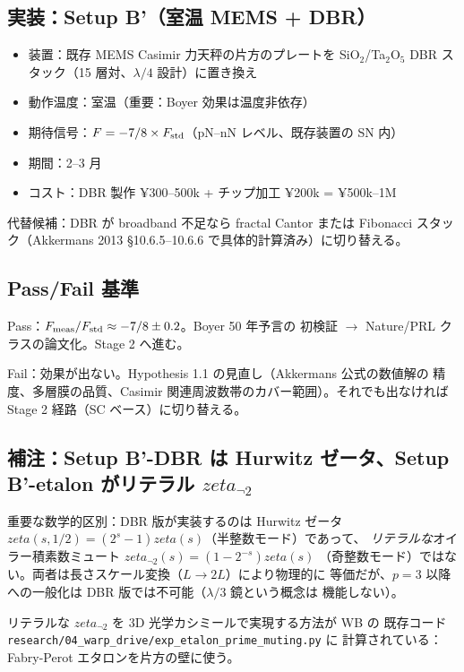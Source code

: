 \documentclass[11pt,a4paper]{article}
\def\zeta{zeta}%
\def\textbf#1{#1}%
\begin{document}
\subsection{実装：Setup B'（室温 MEMS + DBR）}

\begin{itemize}
\item 装置：既存 MEMS Casimir 力天秤の片方のプレートを SiO$_2$/Ta$_2$O$_5$ DBR
  スタック（15 層対、$\lambda/4$ 設計）に置き換え
\item 動作温度：室温（重要：Boyer 効果は温度非依存）
\item 期待信号：$F = -7/8 \times F_{\rm std}$（pN--nN レベル、既存装置の SN 内）
\item 期間：2--3 月
\item コスト：DBR 製作 ¥300--500k + チップ加工 ¥200k = \textbf{¥500k--1M}
\end{itemize}

\textbf{代替候補}：DBR が broadband 不足なら fractal Cantor または Fibonacci
スタック（Akkermans 2013 §10.6.5--10.6.6 で具体的計算済み）に切り替える。

\subsection{Pass/Fail 基準}

\textbf{Pass}：$F_{\rm meas}/F_{\rm std} \approx -7/8 \pm 0.2$。Boyer 50 年予言の
初検証 $\to$ \textbf{Nature/PRL クラスの論文化}。Stage 2 へ進む。

\textbf{Fail}：効果が出ない。Hypothesis 1.1 の見直し（Akkermans 公式の数値解の
精度、多層膜の品質、Casimir 関連周波数帯のカバー範囲）。それでも出なければ
Stage 2 経路（SC ベース）に切り替える。

\subsection{補注：Setup B'-DBR は Hurwitz ゼータ、Setup B'-etalon がリテラル $\zeta_{\neg 2}$}

\textbf{重要な数学的区別}：DBR 版が実装するのは Hurwitz ゼータ
$\zeta(s, 1/2) = (2^s - 1)\zeta(s)$（半整数モード）であって、
\emph{リテラルな}オイラー積素数ミュート $\zeta_{\neg 2}(s) = (1 - 2^{-s})\zeta(s)$
（奇整数モード）ではない。両者は長さスケール変換（$L \to 2L$）により物理的に
等価だが、$p=3$ 以降への一般化は DBR 版では不可能（$\lambda/3$ 鏡という概念は
機能しない）。

\textbf{リテラルな $\zeta_{\neg 2}$ を 3D 光学カシミールで実現する方法}が WB の
既存コード \texttt{research/04\_warp\_drive/exp\_etalon\_prime\_muting.py} に
計算されている：\textbf{Fabry-Perot エタロンを片方の壁に使う}。
\end{document}
